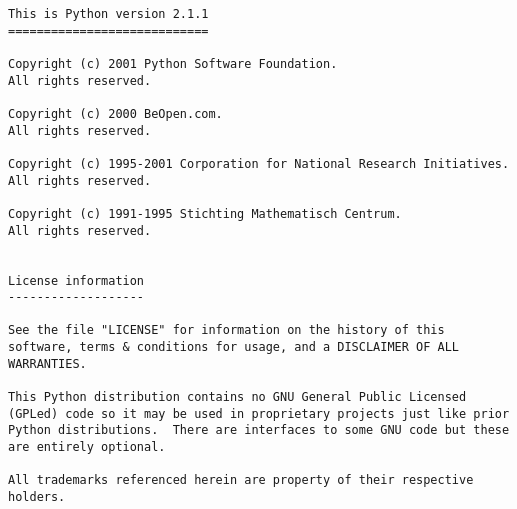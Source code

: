 \begin{verbatim}
This is Python version 2.1.1
============================

Copyright (c) 2001 Python Software Foundation.
All rights reserved.

Copyright (c) 2000 BeOpen.com.
All rights reserved.

Copyright (c) 1995-2001 Corporation for National Research Initiatives.
All rights reserved.

Copyright (c) 1991-1995 Stichting Mathematisch Centrum.
All rights reserved.


License information
-------------------

See the file "LICENSE" for information on the history of this
software, terms & conditions for usage, and a DISCLAIMER OF ALL
WARRANTIES.

This Python distribution contains no GNU General Public Licensed
(GPLed) code so it may be used in proprietary projects just like prior
Python distributions.  There are interfaces to some GNU code but these
are entirely optional.

All trademarks referenced herein are property of their respective
holders.
\end{verbatim}

